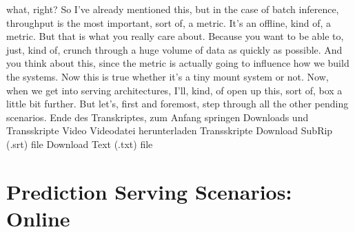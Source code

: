 {{{{{{{    what, right?
    So I've already mentioned this, but in the case of batch inference,
    throughput is the most important, sort of, a metric.
    It's an offline, kind of, a metric.
    But that is what you really care about.
    Because you want to be able to, just, kind of,
    crunch through a huge volume of data as quickly as possible.
    And you think about this, since the metric is actually going
    to influence how we build the systems.
    Now this is true whether it's a tiny mount system or not.
    Now, when we get into serving architectures,
    I'll, kind, of open up this, sort of, box a little bit further.
    But let's, first and foremost, step through all
    the other pending scenarios.
    Ende des Transkriptes, zum Anfang springen
    Downloads und Transskripte
    Video
    Videodatei herunterladen
    Transskripte
    Download SubRip (.srt) file
    Download Text (.txt) file

\section{Prediction Serving Scenarios: Online}

}}}}}}}
